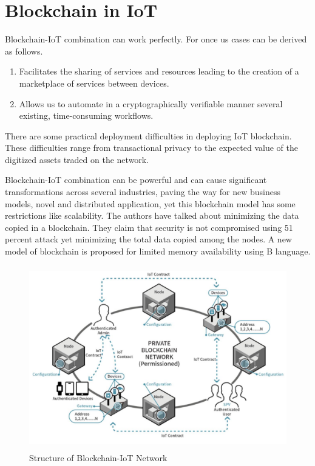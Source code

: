\section{Blockchain in IoT}
Blockchain-IoT combination can work perfectly. For once us cases can be derived as follows.
\begin{enumerate}
  \item Facilitates the sharing of services and resources leading to the creation of a marketplace of services between devices.
  \item Allows us to automate in a cryptographically verifiable manner several existing, time-consuming workflows.
\end{enumerate}
There are some practical deployment difficulties in deploying IoT blockchain. These difficulties range from transactional privacy to the expected value of the digitized assets traded on the network.

Blockchain-IoT combination can be powerful and can cause significant transformations across several industries, paving the way for new business models, novel and distributed application, yet this blockchain model has some restrictions like scalability. The authors have talked about minimizing the data copied in a blockchain. They claim that security is not compromised using 51 percent attack yet minimizing the total data copied among the nodes. A new model of blockchain is proposed for limited memory availability using B language.
\begin{figure}[ht]
  \centering
 \includegraphics[width = 13cm, height = 8cm] {Figures/iot.jpg}
  \caption{Structure of Blockchain-IoT Network}
  \label{StH}	
\end{figure}
